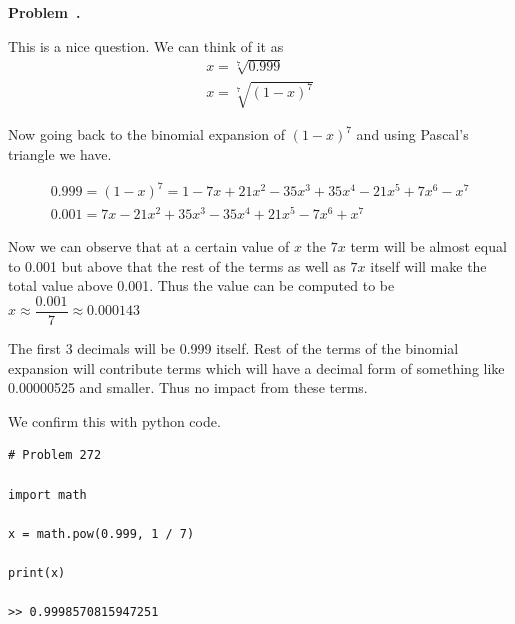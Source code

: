 \documentclass[10pt]{article}
\newcounter{problem}
\newenvironment{problem}[1][]{
  \refstepcounter{problem}
  \par\noindent\textbf{Problem~\theproblem. #1}\par
  \vspace{0.5em}
}{\vspace{1em}}
\begin{document}
\begin{problem} %
  This is a nice question. We can think of it as 
  \begin{gather*}
    x = \sqrt[7]{0.999}\\
    x = \sqrt[7]{(1 - x)^7}
  \end{gather*}

  Now going back to the binomial expansion of $(1 - x)^7$ and using Pascal's triangle we have.

  \begin{gather*}
    0.999 = (1 - x)^7 = 1 - 7x + 21x^2 - 35x^3 + 35x^4 - 21x^5 + 7x^6 - x^7\\
    0.001 = 7x - 21x^2 + 35x^3 - 35x^4 + 21x^5 - 7x^6 + x^7
  \end{gather*}

  Now we can observe that at a certain value of $x$ the $7x$ term will be almost equal to 0.001 but 
  above that the rest of the terms as well as $7x$ itself will make the total value above 0.001. Thus the 
  value can be computed to be $x \approx \dfrac{0.001}{7} \approx 0.000143$

  The first 3 decimals will be 0.999 itself. Rest of the terms of the binomial expansion will contribute 
  terms which will have a decimal form of something like 0.00000525 and smaller. Thus no impact from these terms.

  We confirm this with python code.
\begin{lstlisting}
# Problem 272

import math

x = math.pow(0.999, 1 / 7)

print(x)

>> 0.9998570815947251
\end{lstlisting}
\end{problem}
\end{document}
